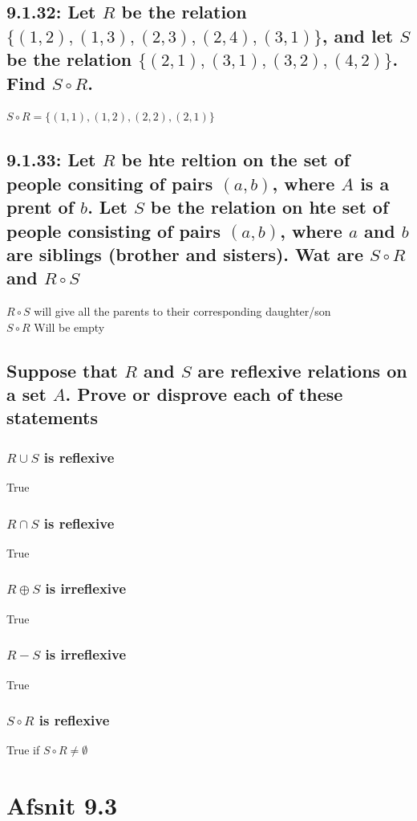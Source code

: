 \documentclass[12pt, a4paper]{report}
\begin{document}
				\subsection{9.1.32: Let $R$ be the relation $\{(1,2),(1,3),(2,3),(2,4),(3,1)\}$, and let $S$ be the relation $\{(2,1),(3,1),(3,2),(4,2)\}$. Find $S\circ R$.}
					$S\circ R=\{(1,1),(1,2),(2,2),(2,1)\}$
				\subsection{9.1.33: Let $R$ be hte reltion on the set of people consiting of pairs $(a,b)$, where $A$ is a prent of $b$. Let $S$ be the relation on hte set of people consisting of pairs $(a,b)$, where $a$ and $b$ are siblings (brother and sisters). Wat are $S \circ R$ and $R\circ S$}
					$R\circ S$ will give all the parents to their corresponding daughter/son\\
					$S\circ R$ Will be empty
				\setcounter{subsection}{51}
				\subsection{Suppose that $R$ and $S$ are reflexive relations on a set $A$. Prove or disprove each of these statements}
					\subsubsection{$R\cup S$ is reflexive}
						True
					\subsubsection{$R\cap S$ is reflexive}
						True
					\subsubsection{$R\oplus S$ is irreflexive}
						True
					\subsubsection{$R-S$ is irreflexive}
						True
					\subsubsection{$S\circ R$ is reflexive}
						True if $S\circ R \neq \emptyset$
			\section{Afsnit 9.3}
				\setcounter{subsection}{0}
\end{document}
